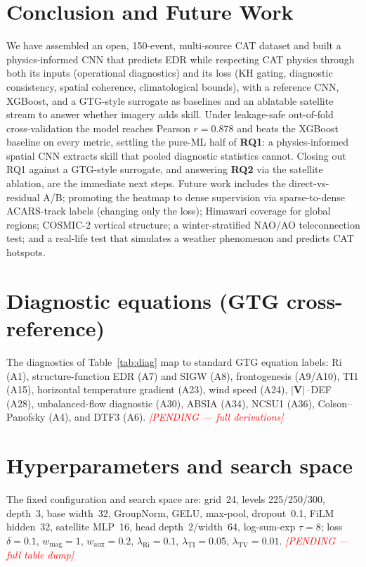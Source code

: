 \documentclass[11pt]{article}
\newcommand{\todo}[1]{\textit{\textcolor{red}{[PENDING --- #1]}}}
\begin{document}
\section{Conclusion and Future Work}
\label{sec:conclusion}
We have assembled an open, 150-event, multi-source CAT dataset and built a
physics-informed CNN that predicts EDR while respecting CAT physics
through both its inputs (operational diagnostics) and its loss (KH gating,
diagnostic consistency, spatial coherence, climatological bounds), with a
reference CNN, XGBoost, and a GTG-style surrogate as baselines and an
ablatable satellite stream to answer whether imagery adds skill. Under
leakage-safe out-of-fold cross-validation the model reaches Pearson
$r=0.878$ and beats the XGBoost baseline on every metric, settling the
pure-ML half of \textbf{RQ1}: a physics-informed spatial CNN extracts
skill that pooled diagnostic statistics cannot. Closing out RQ1 against a
GTG-style surrogate, and answering \textbf{RQ2} via the satellite
ablation, are the immediate next steps. Future work includes the direct-vs-residual A/B;
promoting the heatmap to dense supervision via sparse-to-dense
ACARS-track labels (changing only the loss); Himawari coverage for global
regions; COSMIC-2 vertical structure; a winter-stratified NAO/AO
teleconnection test; and a real-life test that simulates a weather
phenomenon and predicts CAT hotspots.




\appendix
\section{Diagnostic equations (GTG cross-reference)}
The diagnostics of Table~\ref{tab:diag} map to standard GTG equation
labels: Ri (A1), structure-function EDR (A7) and SIGW (A8), frontogenesis
(A9/A10), TI1 (A15), horizontal temperature gradient (A23), wind speed
(A24), $|\mathbf{V}|\cdot$DEF (A28), unbalanced-flow diagnostic (A30),
ABSIA (A34), NCSU1 (A36), Colson--Panofsky (A4), and DTF3 (A6).
\todo{full derivations}

\section{Hyperparameters and search space}
The fixed configuration and search space are: grid~24, levels
225/250/300, depth~3, base width~32, GroupNorm, GELU, max-pool,
dropout~0.1, FiLM hidden~32, satellite MLP~16, head depth~2/width~64,
log-sum-exp $\tau{=}8$; loss $\delta{=}0.1$, $w_{\mathrm{mag}}{=}1$,
$w_{\mathrm{aux}}{=}0.2$, $\lambda_{\mathrm{Ri}}{=}0.1$,
$\lambda_{\mathrm{TI}}{=}0.05$, $\lambda_{\mathrm{TV}}{=}0.01$.
\todo{full table dump}
\end{document}
